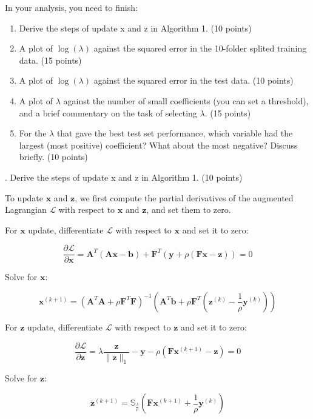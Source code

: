 \documentclass[10pt]{article}
\renewcommand{\mathbf}{\boldsymbol}
\newcommand{\Se}{\mathbb{S}}
\begin{document}
In your analysis, you need to finish:
\begin{enumerate}
	\item  Derive the steps of update x and z in Algorithm 1. (10 points)
	\item  A plot of $\log(\lambda)$ against the squared error in the 10-folder splited training data. (15 points)
	\item  A plot of $\log(\lambda)$ against the squared error in the test data. (10 points)
	\item  A plot of $\lambda$ against the number of small coefficients (you can set a threshold), and a brief commentary on the task of selecting $\lambda$. (15 points)
	\item  For the $\lambda$ that gave the best test set performance, which variable had the largest (most positive) coefficient? What about the most negative? Discuss briefly.  (10 points)
\end{enumerate}

. Derive the steps of update x and z in Algorithm 1. (10 points)

To update $\mathbf{x}$ and $\mathbf{z}$, we first compute the partial derivatives of the augmented Lagrangian $\mathcal{L}$ with respect to $\mathbf{x}$ and $\mathbf{z}$, and set them to zero.

For $\mathbf{x}$ update, differentiate $\mathcal{L}$ with respect to $\mathbf{x}$ and set it to zero:

$$\frac{\partial \mathcal{L}}{\partial \mathbf{x}} = \mathbf{A}^T(\mathbf{A}\mathbf{x}-\mathbf{b}) + \mathbf{F}^T(\mathbf{y} + \rho (\mathbf{F}\mathbf{x} - \mathbf{z})) = 0$$

Solve for $\mathbf{x}$:

$$\mathbf{x}^{(k+1)} = (\mathbf{A}^T\mathbf{A} + \rho \mathbf{F}^T\mathbf{F})^{-1}(\mathbf{A}^T\mathbf{b} + \rho \mathbf{F}^T(\mathbf{z}^{(k)} - \frac{1}{\rho}\mathbf{y}^{(k)}))$$

For $\mathbf{z}$ update, differentiate $\mathcal{L}$ with respect to $\mathbf{z}$ and set it to zero:

$$\frac{\partial \mathcal{L}}{\partial \mathbf{z}} = \lambda \frac{\mathbf{z}}{\lVert \mathbf{z} \rVert_1} - \mathbf{y} - \rho (\mathbf{F}\mathbf{x}^{(k+1)} - \mathbf{z}) = 0$$

Solve for $\mathbf{z}$:

$$\mathbf{z}^{(k+1)} = \Se_{\frac{\lambda}{\rho}}(\mathbf{F}\mathbf{x}^{(k+1)} + \frac{1}{\rho}\mathbf{y}^{(k)})$$
\end{document}
